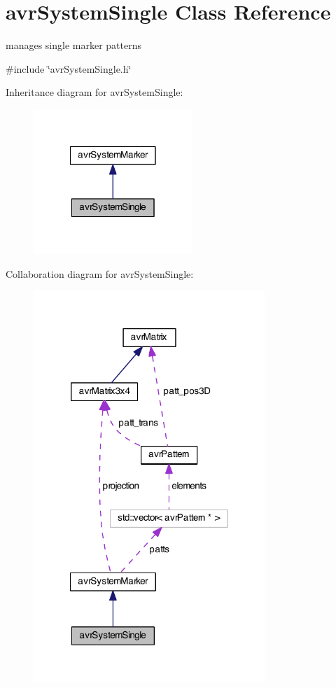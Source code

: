 \hypertarget{classavr_system_single}{\section{avr\-System\-Single Class Reference}
\label{classavr_system_single}
}


manages single marker patterns  




{\ttfamily \#include \char`\"{}avr\-System\-Single.\-h\char`\"{}}



Inheritance diagram for avr\-System\-Single\-:\nopagebreak
\begin{figure}[H]
\begin{center}
\leavevmode
\includegraphics[width=170pt]{classavr_system_single__inherit__graph}
\end{center}
\end{figure}


Collaboration diagram for avr\-System\-Single\-:\nopagebreak
\begin{figure}[H]
\begin{center}
\leavevmode
\includegraphics[width=248pt]{classavr_system_single__coll__graph}
\end{center}
\end{figure}

